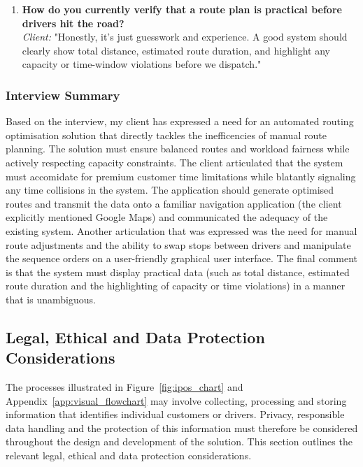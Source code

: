 \documentclass[11pt]{article}
\begin{document}
\begin{enumerate}[label={\LARGE Q\arabic*\,}]
    \item \textbf{How do you currently verify that a route plan is practical before drivers hit the road?} \\
    \textit{Client:} "Honestly, it's just guesswork and experience. A good system should clearly show total distance, estimated route duration, and highlight any capacity or time-window violations before we dispatch."
\end{enumerate}

\subsubsection{Interview Summary}
Based on the interview, my client has expressed a need for an automated routing optimisation solution that directly tackles the inefficencies of manual route planning. The solution must ensure balanced routes and workload fairness while actively respecting capacity constraints. The client articulated that the system must accomidate for premium customer time limitations while blatantly signaling any time collisions in the system. The application should generate optimised routes and transmit the data onto a familiar navigation application (the client explicitly mentioned Google Maps) and communicated the adequacy of the existing system. Another articulation that was expressed was the need for manual route adjustments and the ability to swap stops between drivers and manipulate the sequence orders on a user-friendly graphical user interface. The final comment is that the system must display practical data (such as total distance, estimated route duration and the highlighting of capacity or time violations) in a manner that is unambiguous. 



\subsection{Legal, Ethical and Data Protection Considerations}
The processes illustrated in Figure~\ref{fig:ipos_chart} and Appendix~\ref{app:visual_flowchart} may involve collecting, processing and storing information that identifies individual customers or drivers. Privacy, responsible data handling and the protection of this information must therefore be considered throughout the design and development of the solution. This section outlines the relevant legal, ethical and data protection considerations.
\end{document}
